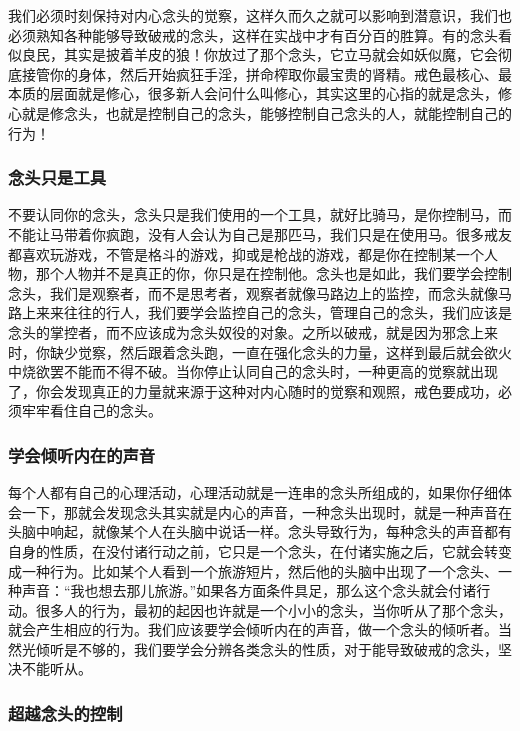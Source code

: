 我们必须时刻保持对内心念头的觉察，这样久而久之就可以影响到潜意识，我们也必须熟知各种能够导致破戒的念头，这样在实战中才有百分百的胜算。有的念头看似良民，其实是披着羊皮的狼！你放过了那个念头，它立马就会如妖似魔，它会彻底接管你的身体，然后开始疯狂手淫，拼命榨取你最宝贵的肾精。戒色最核心、最本质的层面就是修心，很多新人会问什么叫修心，其实这里的心指的就是念头，修心就是修念头，也就是控制自己的念头，能够控制自己念头的人，就能控制自己的行为！

\subsubsection{念头只是工具}

不要认同你的念头，念头只是我们使用的一个工具，就好比骑马，是你控制马，而不能让马带着你疯跑，没有人会认为自己是那匹马，我们只是在使用马。很多戒友都喜欢玩游戏，不管是格斗的游戏，抑或是枪战的游戏，都是你在控制某一个人物，那个人物并不是真正的你，你只是在控制他。念头也是如此，我们要学会控制念头，我们是观察者，而不是思考者，观察者就像马路边上的监控，而念头就像马路上来来往往的行人，我们要学会监控自己的念头，管理自己的念头，我们应该是念头的掌控者，而不应该成为念头奴役的对象。之所以破戒，就是因为邪念上来时，你缺少觉察，然后跟着念头跑，一直在强化念头的力量，这样到最后就会欲火中烧欲罢不能而不得不破。当你停止认同自己的念头时，一种更高的觉察就出现了，你会发现真正的力量就来源于这种对内心随时的觉察和观照，戒色要成功，必须牢牢看住自己的念头。

\subsubsection{学会倾听内在的声音}

每个人都有自己的心理活动，心理活动就是一连串的念头所组成的，如果你仔细体会一下，那就会发现念头其实就是内心的声音，一种念头出现时，就是一种声音在头脑中响起，就像某个人在头脑中说话一样。念头导致行为，每种念头的声音都有自身的性质，在没付诸行动之前，它只是一个念头，在付诸实施之后，它就会转变成一种行为。比如某个人看到一个旅游短片，然后他的头脑中出现了一个念头、一种声音：“我也想去那儿旅游。”如果各方面条件具足，那么这个念头就会付诸行动。很多人的行为，最初的起因也许就是一个小小的念头，当你听从了那个念头，就会产生相应的行为。我们应该要学会倾听内在的声音，做一个念头的倾听者。当然光倾听是不够的，我们要学会分辨各类念头的性质，对于能导致破戒的念头，坚决不能听从。

\subsubsection{超越念头的控制}

